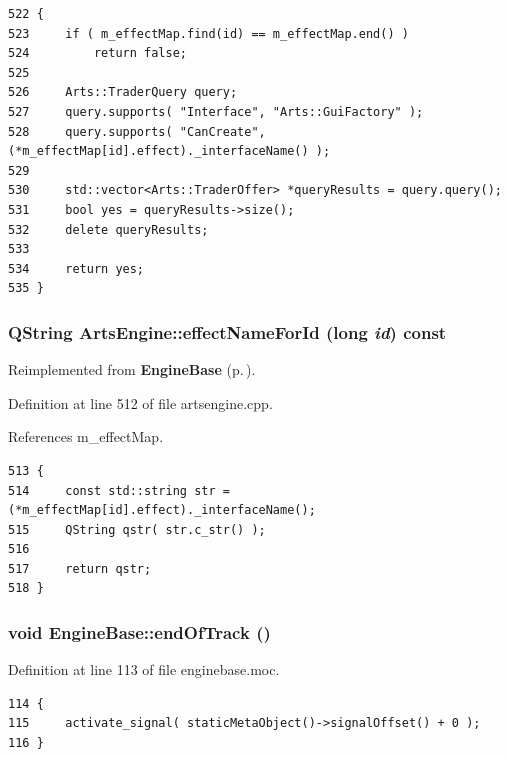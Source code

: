 \footnotesize\begin{verbatim}522 {
523     if ( m_effectMap.find(id) == m_effectMap.end() )
524         return false;
525 
526     Arts::TraderQuery query;
527     query.supports( "Interface", "Arts::GuiFactory" );
528     query.supports( "CanCreate", (*m_effectMap[id].effect)._interfaceName() );
529 
530     std::vector<Arts::TraderOffer> *queryResults = query.query();
531     bool yes = queryResults->size();
532     delete queryResults;
533 
534     return yes;
535 }
\end{verbatim}\normalsize 
{}
\subsubsection{\setlength{\rightskip}{0pt plus 5cm}QString Arts\-Engine::effect\-Name\-For\-Id (long {\em id}) const\hspace{0.3cm}{\tt  [virtual]}}\label{classArtsEngine_ArtsEnginea12}




Reimplemented from {\bf Engine\-Base} {\rm (p.\,\pageref{classEngineBase_EngineBasea18})}.

Definition at line 512 of file artsengine.cpp.

References m\_\-effect\-Map.



\footnotesize\begin{verbatim}513 {
514     const std::string str = (*m_effectMap[id].effect)._interfaceName();
515     QString qstr( str.c_str() );
516 
517     return qstr;
518 }
\end{verbatim}\normalsize 
{}
\subsubsection{\setlength{\rightskip}{0pt plus 5cm}void Engine\-Base::end\-Of\-Track ()\hspace{0.3cm}{\tt  [signal, inherited]}}\label{classEngineBase_EngineBasel0}




Definition at line 113 of file enginebase.moc.



\footnotesize\begin{verbatim}114 {
115     activate_signal( staticMetaObject()->signalOffset() + 0 );
116 }
\end{verbatim}\normalsize 
{}
